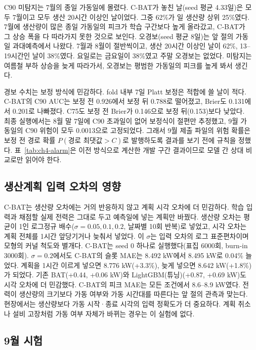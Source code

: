 C90 미탐지는 7월의 종일 가동일에 몰렸다. C-BAT가 놓친 날(seed 평균 4.33일)은 모두 7월이고 모두 생산 20시간 이상인 날이었다. 그중 62\%가 일 생산량 상위 25\%였다. 7월에 생산량이 많은 종일 가동일의 피크가 학습 구간보다 높게 올라갔고, C-BAT가 그 상승 폭을 다 따라가지 못한 것으로 보인다. 오경보(seed 평균 8일)는 앞 절의 가동일 과대예측에서 나왔다. 7월과 8월이 절반씩이고, 생산 20시간 이상인 날이 62\%, 13--19시간인 날이 38\%였다. 요일로는 금요일이 38\%였고 주말 오경보는 없었다. 미탐지는 여름철 부하 상승을 늦게 따라가서, 오경보는 평범한 가동일의 피크를 높게 봐서 생긴다.

경보 수치는 보정 방식에 민감하다. fold 내부 7일 Platt 보정은 적합에 쓸 날이 적다. C-BAT의 C90 AUC는 보정 전 0.926에서 보정 뒤 0.788로 떨어졌고, Brier도 0.131에서 0.201로 나빠졌다. C75도 보정 전 Brier가 0.146으로 보정 뒤(0.153)보다 낮았다. 최종 실행에서는 8월 말 7일에 C90 초과일이 없어 보정식이 절편만 추정했고, 9월 가동일의 C90 위험이 모두 0.0013으로 고정되었다. 그래서 9월 제출 파일의 위험 확률은 보정 전 경로 확률 $P(\text{경로 최댓값} > C)$로 발행하도록 결과를 보기 전에 규칙을 정했다. 표~\ref{tab:ch4-alarm}은 이전 방식으로 계산한 개발 구간 결과이므로 모델 간 상대 비교로만 읽어야 한다.

\subsection{생산계획 입력 오차의 영향}

C-BAT는 생산량 오차에는 거의 반응하지 않고 계획 시각 오차에 더 민감하다. 학습 입력과 채점할 실제 전력은 그대로 두고 예측일에 넣는 계획만 바꿨다. 생산량 오차는 평균이 1인 로그정규 배수($\sigma=0.05,0.1,0.2$, 날짜별 10회 반복)로 넣었고, 시각 오차는 계획 전체를 1시간 앞당기거나 늦춰서 넣었다. 이 $\sigma$는 입력 오차의 로그 표준편차이며 모형의 커널 척도와 별개다. C-BAT는 seed 0 하나로 실행했다(표집 6000회, burn-in 3000회). $\sigma=0.2$에서도 C-BAT의 슬롯 MAE는 8.492 kW에서 8.495 kW로 0.04\% 늘었다. 계획을 1시간 이르게 넣으면 8.776 kW(+3.3\%), 늦게 넣으면 8.642 kW(+1.8\%)가 되었다. 기존 BAT(+0.44, +0.06 kW)와 LightGBM(튜닝)(+0.87, +0.69 kW)도 시각 오차에 더 민감했다. C-BAT의 피크 MAE는 모든 조건에서 8.6--8.9 kW였다. 전력이 생산량의 크기보다 가동 여부와 가동 시간대를 따른다는 앞 절의 관측과 맞는다. 현장에서는 생산량보다 가동 시작·종료 시각의 입력 정확도가 더 중요하다. 계획 취소나 설비 고장처럼 가동 여부 자체가 바뀌는 경우는 이 실험에 없다.

\subsection{9월 시험}

